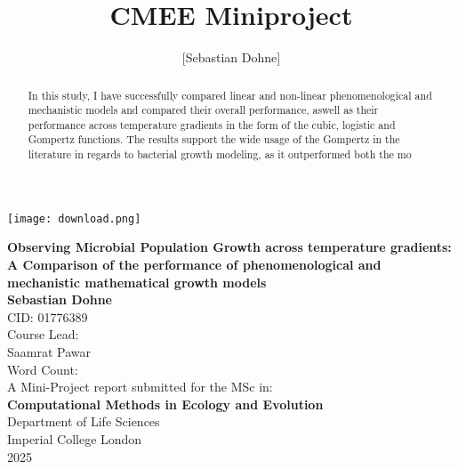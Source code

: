 \documentclass[11pt]{article}
\title{CMEE Miniproject}
\author{[Sebastian Dohne]}
\date{}
\begin{document}
\begin{titlepage}
    \texttt{[image: download.png]}\\
    \begin{center}
    \vspace{1.75cm}
    \Large
        \textbf{Observing Microbial Population Growth across temperature gradients: A Comparison of the performance of phenomenological and mechanistic mathematical growth models }
        \vspace{2.5cm}\\
        \textbf{Sebastian Dohne}\\
        CID: 01776389\\
        \vspace{1.5cm}
        \large
        Course Lead:\\
        Saamrat Pawar\\
        \vspace{1.5cm}
        Word Count:  \\
        \vspace{4cm}
        A Mini-Project report submitted for the MSc in:\\ \textbf{Computational Methods in Ecology and Evolution}\\
        \vspace{1.5cm}
        Department of Life Sciences\\
        Imperial College London\\
        2025
    \end{center}
\end{titlepage}

\begin{abstract}
In this study, I have successfully compared linear and non-linear phenomenological and mechanistic models and compared their overall performance, aswell as their performance across temperature gradients in the form of the cubic, logistic and Gompertz functions. The results support the wide usage of the Gompertz in the literature in regards to bacterial growth modeling, as it outperformed both the mo
\end{abstract}

\pagebreak
\end{document}
